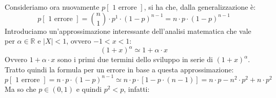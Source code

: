 \documentclass[a4paper,12pt, oneside]{book}
\begin{document}
Consideriamo ora nuovamente $p[\mbox{ 1 errore }]$, si ha che, dalla
generalizzazione è:
\[p[\mbox{ 1 errore }]={{n}\choose{1}}\cdot p^1\cdot(1-p)^{n-1}=n\cdot p\cdot
  (1-p)^{n-1}\]
Introduciamo un'approssimazione interessante dell'analisi matematica che vale
per $\alpha\in \mathbb{R}$ e $|X|<1$, ovvero $-1<x<1$:
\[(1+x)^\alpha\simeq 1+\alpha\cdot x\]
Ovvero $1+\alpha\cdot x$ sono i primi due termini dello sviluppo in serie di
$(1+x)^\alpha$.\\
Tratto quindi la formula per un errore in base a questa approssimazione:
\[p[\mbox{ 1 errore }]=n\cdot p\cdot(1-p)^{n-1}\simeq n\cdot p\cdot
  [1-p\cdot(n-1)]=n\cdot p-n^2\cdot p^2+n\cdot p^2\]
Ma so che $p\in(0,1)$ e quindi $p^2<p$, infatti: 
\begin{figure}[H]
  \centering
\end{figure}
\end{document}
